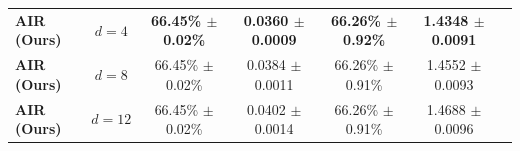 \documentclass{article}
\theoremstyle{plain}
\theoremstyle{definition}
\theoremstyle{remark}
\begin{document}
\begin{table}[h]
\begin{center}
\begin{small}
\begin{sc}
\begin{tabular}{lcccccc}
\textbf{AIR (Ours)} & $d=4$ & \textbf{66.45\% $\pm$ 0.02\%} & \textbf{0.0360 $\pm$ 0.0009} & \textbf{66.26\% $\pm$ 0.92\%} & \textbf{1.4348 $\pm$ 0.0091} \\
\textbf{AIR (Ours)} & $d=8$ & 66.45\% $\pm$ 0.02\% & 0.0384 $\pm$ 0.0011 & 66.26\% $\pm$ 0.91\% & 1.4552 $\pm$ 0.0093 \\
\textbf{AIR (Ours)} & $d=12$ & 66.45\% $\pm$ 0.02\% & 0.0402 $\pm$ 0.0014 & 66.26\% $\pm$ 0.91\% & 1.4688 $\pm$ 0.0096 \\
\bottomrule
\end{tabular}
\end{sc}
\end{small}
\end{center}
\end{table}
\end{document}

